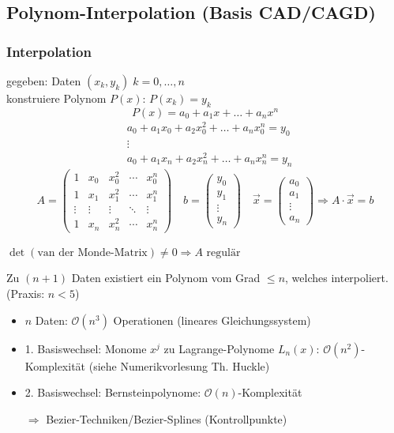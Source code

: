 \newpage
{}

\subsection{Polynom-Interpolation (Basis CAD/CAGD)}

\subsubsection*{Interpolation}
\label{interpolation}%
gegeben: Daten $(x_k, y_k)\;k=0,\ldots,n$\\
konstruiere Polynom $P(x)$: $P(x_k) = y_k$
%
\[ P(x) = a_0 + a_1x + \ldots + a_nx^n \]
\vspace{-1cm}
\begin{align*}
&a_0 + a_1x_0 + a_2x_0^2 + \ldots + a_nx_0^n = y_0 \\
&\vdots \\
&a_0 + a_1x_n + a_2x_n^2 + \ldots + a_nx_n^n = y_n
\end{align*}
\[
A = 
\begin{pmatrix}
	1 & x_0 & x_0^2 & \cdots & x_0^n \\
	1 & x_1 & x_1^2 & \cdots & x_1^n \\
	\vdots & \vdots & \vdots & \ddots & \vdots \\
	1 & x_n & x_n^2 & \cdots & x_n^n
\end{pmatrix} \quad
b = \begin{pmatrix}	y_0 \\	y_1 \\	\vdots \\	y_n \end{pmatrix} \quad
\vec{x} = \begin{pmatrix}	a_0 \\	a_1 \\	\vdots \\	a_n \end{pmatrix}
\Rightarrow
A \cdot \vec{x} = b
\]

\noindent $\det(\text{van der Monde-Matrix}) \neq 0 \Rightarrow A\text{ regulär}$

\begin{proposition}
	Zu $(n + 1)$ Daten existiert ein Polynom vom Grad $\le n$, welches interpoliert. (Praxis: $n < 5$)
\end{proposition}

\begin{note}
  \begin{itemize}
    \item $n$ Daten: $\mathcal O (n^3)$ Operationen (lineares Gleichungssystem)
    \item 1. Basiswechsel: Monome $x^j$ zu Lagrange-Polynome $L_n(x)$: $\mathcal O (n^2)$-Komplexität (siehe Numerikvorlesung Th. Huckle)
    \item 2. Basiswechsel: Bernsteinpolynome: $\mathcal O (n)$-Komplexität
    \item[$\Rightarrow$] Bezier-Techniken/Bezier-Splines (Kontrollpunkte)
  \end{itemize}
\end{note}


